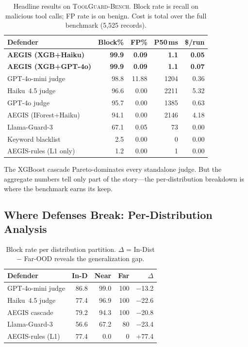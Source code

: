 \documentclass[sigconf]{acmart}
\newcommand{\bench}{\textsc{ToolGuard-Bench}\xspace}
\begin{document}
\begin{table}[t]
\centering\small
\caption{Headline results on \bench. Block rate is recall on malicious tool calls; FP rate is on benign. Cost is total over the full benchmark (5{,}525 records).}
\vspace{-0.1in}
\label{tab:overall}
\begin{tabular}{lrrrr}
\toprule
Defender & Block\% & FP\% & P50\,ms & \$/run \\
\midrule
\rowcolor{green!8}
\textbf{AEGIS (XGB+Haiku)} & \textbf{99.9} & \textbf{0.09} & \textbf{1.1} & \textbf{0.05} \\
\rowcolor{green!8}
\textbf{AEGIS (XGB+GPT-4o)} & \textbf{99.9} & \textbf{0.09} & \textbf{1.1} & \textbf{0.07} \\
GPT-4o-mini judge & 98.8 & 11.88 & 1204 & 0.36 \\
Haiku~4.5 judge & 96.6 & 0.00 & 2211 & 5.32 \\
GPT-4o judge & 95.7 & 0.00 & 1385 & 0.63 \\
AEGIS (IForest+Haiku) & 94.1 & 0.00 & 2146 & 4.18 \\
Llama-Guard-3 & 67.1 & 0.05 & 73 & 0.00 \\
Keyword blacklist & 2.5 & 0.00 & 0 & 0.00 \\
AEGIS-rules (L1 only) & 1.2 & 0.00 & 1 & 0.00 \\
\bottomrule
\end{tabular}
\vspace{-0.1in}
\end{table}

The XGBoost cascade Pareto-dominates every standalone judge.
But the aggregate numbers tell only part of the story---the per-distribution breakdown is where the benchmark earns its keep.

\subsection{Where Defenses Break: Per-Distribution Analysis}

\begin{table}[t]
\centering\small
\caption{Block rate per distribution partition. $\Delta$ = In-Dist $-$ Far-OOD reveals the generalization gap.}
\vspace{-0.1in}
\label{tab:perdist}
\begin{tabular}{lrrrr}
\toprule
Defender & In-D & Near & Far & $\Delta$ \\
\midrule
GPT-4o-mini judge & 86.8 & 99.0 & 100 & $-$13.2 \\
Haiku~4.5 judge & 77.4 & 96.9 & 100 & $-$22.6 \\
AEGIS cascade & 79.2 & 94.3 & 100 & $-$20.8 \\
Llama-Guard-3 & 56.6 & 67.2 & 80 & $-$23.4 \\
AEGIS-rules (L1) & 77.4 & 0.0 & 0 & +77.4 \\
\bottomrule
\end{tabular}
\vspace{-0.1in}
\end{table}
\end{document}
